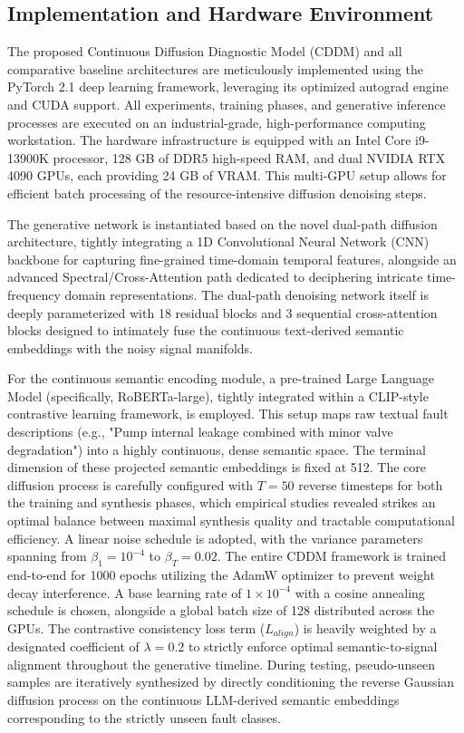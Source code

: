 \subsection{Implementation and Hardware Environment}
The proposed Continuous Diffusion Diagnostic Model (CDDM) and all comparative baseline architectures are meticulously implemented using the PyTorch 2.1 deep learning framework, leveraging its optimized autograd engine and CUDA support. All experiments, training phases, and generative inference processes are executed on an industrial-grade, high-performance computing workstation. The hardware infrastructure is equipped with an Intel Core i9-13900K processor, 128 GB of DDR5 high-speed RAM, and dual NVIDIA RTX 4090 GPUs, each providing 24 GB of VRAM. This multi-GPU setup allows for efficient batch processing of the resource-intensive diffusion denoising steps. 

The generative network is instantiated based on the novel dual-path diffusion architecture, tightly integrating a 1D Convolutional Neural Network (CNN) backbone for capturing fine-grained time-domain temporal features, alongside an advanced Spectral/Cross-Attention path dedicated to deciphering intricate time-frequency domain representations. The dual-path denoising network itself is deeply parameterized with 18 residual blocks and 3 sequential cross-attention blocks designed to intimately fuse the continuous text-derived semantic embeddings with the noisy signal manifolds. 

For the continuous semantic encoding module, a pre-trained Large Language Model (specifically, RoBERTa-large), tightly integrated within a CLIP-style contrastive learning framework, is employed. This setup maps raw textual fault descriptions (e.g., "Pump internal leakage combined with minor valve degradation") into a highly continuous, dense semantic space. The terminal dimension of these projected semantic embeddings is fixed at 512. 
The core diffusion process is carefully configured with $T = 50$ reverse timesteps for both the training and synthesis phases, which empirical studies revealed strikes an optimal balance between maximal synthesis quality and tractable computational efficiency. A linear noise schedule is adopted, with the variance parameters spanning from $\beta_1 = 10^{-4}$ to $\beta_T = 0.02$. The entire CDDM framework is trained end-to-end for 1000 epochs utilizing the AdamW optimizer to prevent weight decay interference. A base learning rate of $1 \times 10^{-4}$ with a cosine annealing schedule is chosen, alongside a global batch size of 128 distributed across the GPUs. The contrastive consistency loss term ($L_{align}$) is heavily weighted by a designated coefficient of $\lambda = 0.2$ to strictly enforce optimal semantic-to-signal alignment throughout the generative timeline. During testing, pseudo-unseen samples are iteratively synthesized by directly conditioning the reverse Gaussian diffusion process on the continuous LLM-derived semantic embeddings corresponding to the strictly unseen fault classes.

